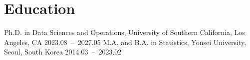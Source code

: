 \documentclass[letterpaper,11pt]{article}
\begin{document}
	\section{Education}
\begin{itemize}[leftmargin=0in, label={}]{
		\item
		Ph.D. in Data Sciences and Operations, University of Southern California, Los Angeles, CA
		\hfill
		2023.08~--~2027.05
		\vspace{-7.55pt}
		M.A. and B.A.  in  Statistics,
		Yonsei University, Seoul, South Korea
		\hfill
		2014.03~--~2023.02
}\end{itemize}

		
	
\end{document}
